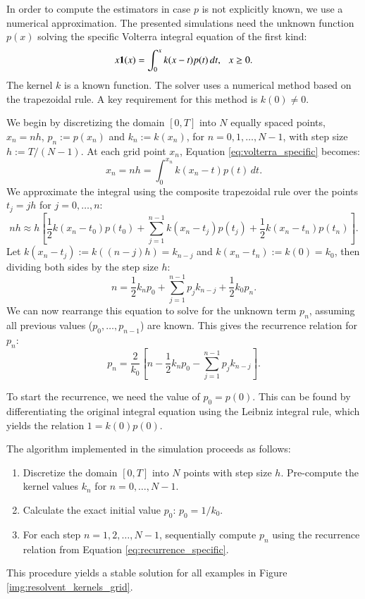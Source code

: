 In order to compute the estimators in case $p$ is not explicitly known, we use a numerical approximation. The presented simulations need the unknown function $p(x)$ solving the specific Volterra integral equation of the first kind:
\begin{equation}
    x \mathbf{1}(x) = \int_{0}^{x} k(x-t) p(t) \,dt, \, \, \, \, x \geq 0.
    \label{eq:volterra_specific}
\end{equation}
The kernel $k$ is a known function. The solver uses a numerical method based on the trapezoidal rule. A key requirement for this method is $k(0) \neq 0$.

We begin by discretizing the domain $[0, T]$ into $N$ equally spaced points, $x_n = n h$, $p_n := p(x_n)$ and $k_n := k(x_n)$, for $n=0, 1, \dots, N-1$, with step size $h := T/(N-1)$.  At each grid point $x_n$, Equation \eqref{eq:volterra_specific} becomes:
\begin{equation}
    x_n = nh = \int_{0}^{x_n} k(x_n - t) p(t) \,dt.
\end{equation}
We approximate the integral using the composite trapezoidal rule over the points $t_j = jh$ for $j=0, \dots, n$:
\begin{equation}
    nh \approx h \left[ \frac{1}{2} k(x_n - t_0) p(t_0) + \sum_{j=1}^{n-1} k(x_n - t_j) p(t_j) + \frac{1}{2} k(x_n - t_n) p(t_n) \right].
\end{equation}
Let $k(x_n-t_j) := k((n-j)h) = k_{n-j}$ and $k(x_n-t_n) := k(0) = k_0$, then dividing both sides by the step size $h$:
\begin{equation}
    n = \frac{1}{2} k_n p_0 + \sum_{j=1}^{n-1} p_j k_{n-j} + \frac{1}{2} k_0 p_n.
\end{equation}
We can now rearrange this equation to solve for the unknown term $p_n$, assuming all previous values ($p_0, \dots, p_{n-1}$) are known. This gives the recurrence relation for $p_n$:
\begin{equation}
    p_n = \frac{2}{k_0} \left[ n - \frac{1}{2} k_n p_0 - \sum_{j=1}^{n-1} p_j k_{n-j} \right].
    \label{eq:recurrence_specific}
\end{equation}

To start the recurrence, we need the value of $p_0 = p(0)$. This can be found by differentiating the original integral equation using the Leibniz integral rule, which yields the relation $1 = k(0)p(0)$.

The algorithm implemented in the simulation proceeds as follows:
\begin{enumerate}
    \item Discretize the domain $[0, T]$ into $N$ points with step size $h$. Pre-compute the kernel values $k_n$ for $n=0, \dots, N-1$.
    \item Calculate the exact initial value $p_0$: $p_0 = 1/k_0$.
    \item For each step $n = 1, 2, \dots, N-1$, sequentially compute $p_n$ using the recurrence relation from Equation \eqref{eq:recurrence_specific}. 
\end{enumerate}
This procedure yields a stable solution for all examples in Figure \ref{img:resolvent_kernels_grid}.

